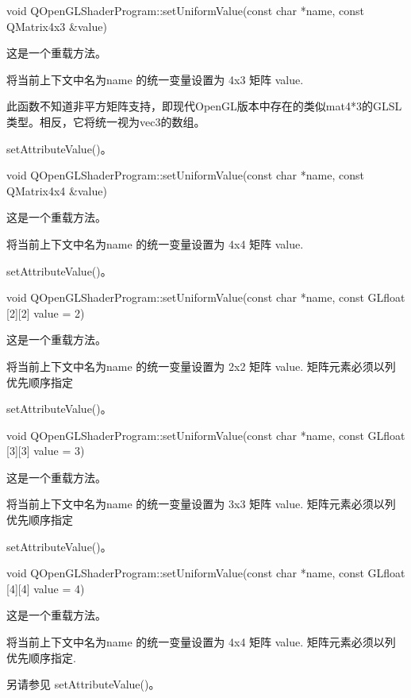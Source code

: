 void QOpenGLShaderProgram::setUniformValue(const char *name, const QMatrix4x3 \&value)

这是一个重载方法。

将当前上下文中名为name 的统一变量设置为 4x3 矩阵 value.


\begin{notice}
此函数不知道非平方矩阵支持，即现代OpenGL版本中存在的类似mat4*3的GLSL类型。相反，它将统一视为vec3的数组。
\end{notice}

\begin{seeAlso}
setAttributeValue()。
\end{seeAlso}

void QOpenGLShaderProgram::setUniformValue(const char *name, const QMatrix4x4 \&value)

这是一个重载方法。

将当前上下文中名为name 的统一变量设置为 4x4 矩阵 value.


\begin{seeAlso}
setAttributeValue()。
\end{seeAlso}

void QOpenGLShaderProgram::setUniformValue(const char *name, const GLfloat [2][2] value = 2)

这是一个重载方法。

将当前上下文中名为name 的统一变量设置为 2x2 矩阵 value. 矩阵元素必须以列优先顺序指定


\begin{seeAlso}
setAttributeValue()。
\end{seeAlso}

void QOpenGLShaderProgram::setUniformValue(const char *name, const GLfloat [3][3] value = 3)

这是一个重载方法。

将当前上下文中名为name 的统一变量设置为 3x3 矩阵 value. 矩阵元素必须以列优先顺序指定


\begin{seeAlso}
setAttributeValue()。
\end{seeAlso}

void QOpenGLShaderProgram::setUniformValue(const char *name, const GLfloat [4][4] value = 4)

这是一个重载方法。

将当前上下文中名为name 的统一变量设置为 4x4 矩阵 value. 矩阵元素必须以列优先顺序指定.


\begin{seeAlso}
另请参见 setAttributeValue()。
\end{seeAlso}

